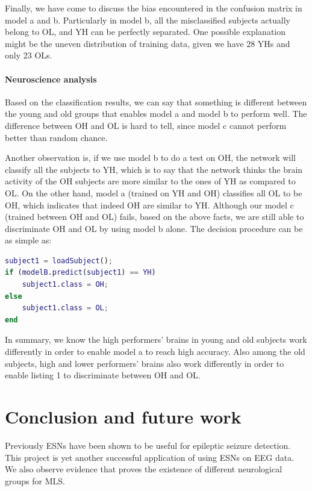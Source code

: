 \documentclass[a4paper,11pt,oneside]{article}
\begin{document}
Finally, we have come to discuss the bias encountered in the confusion matrix in model a and b. Particularly in model b, all the misclassified subjects actually belong to OL, and YH can be perfectly separated. One possible explanation might be the uneven distribution of training data, given we have 28 YHs and only 23 OLs. 


\paragraph{Neuroscience analysis}
Based on the classification results, we can say that something is different between the young and old groups that enables model a and model b to perform well. The difference between OH and OL is hard to tell, since model c cannot perform better than random chance. 

Another observation is, if we use model b to do a test on OH, the network will classify all the subjects to YH, which is to say that the network thinks the brain activity of the OH subjects are more similar to the ones of YH as compared to OL. On the other hand, model a (trained on YH and OH) classifies all OL to be OH, which indicates that indeed OH are similar to YH. Although our model c (trained between OH and OL) fails, based on the above facts, we are still able to discriminate OH and OL by using model b alone. The decision procedure can be as simple as: 

\begin{lstlisting}[language = Matlab, caption = Classification function between OH and OL]
subject1 = loadSubject();
if (modelB.predict(subject1) == YH)
	subject1.class = OH;
else 
	subject1.class = OL;
end
\end{lstlisting}

In summary, we know the high performers' brains in young and old subjects work differently in order to enable model a to reach high accuracy. Also among the old subjects, high and lower performers' brains also work differently in order to enable listing 1 to discriminate between OH and OL.

\section{Conclusion and future work}
Previously ESNs have been shown to be useful for epileptic seizure detection. This project is yet another successful application of using ESNs on EEG data. We also observe evidence that proves the existence of different neurological groups for MLS.
\end{document}
